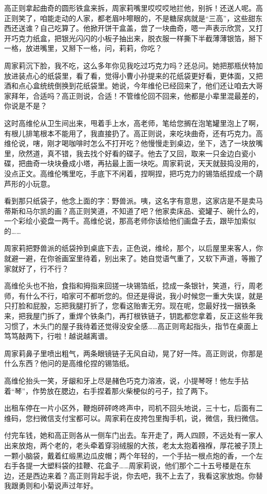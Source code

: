 \documentclass[lang=cn,newtx,12pt,scheme=chinese]{elegantbook}
\begin{document}
高正则拿起曲奇的圆形铁盒来拆，周家莉嘴里哎哎哎地拦他，别拆！还送人呢。高正则笑了，咱能走动的人家，都老眉咔嚓眼的，不是糖尿病就是“三高”，这些甜东西还送谁？自己吃算了。他掀开饼干盒盖，尝了一块曲奇，嗯一声表示欣赏，又打开巧克力纸盒，把银光闪闪的小板子抽出来，脱衣服一样撕下半截薄薄银箔，掰下一格，放进嘴里，又掰下一格，问，莉莉，你吃？

周家莉沉下脸，我不吃，这么多年你见我吃过巧克力吗？还总问。她把那瓶伏特加放进装点心的纸袋里，看了看，觉得小曹小孙提来的花纸袋更好看，更体面，又把酒和点心盒统统倒换到花纸袋里。她说，今年维伦已经回来了，他们还让咱去大哥家拜年，合适吗？高正则说，合适！不管维伦回不回来，他都是小辈里混最差的，你说是不是？

这时高维伦从卫生间出来，甩着手上水，高老师，笔给您搁在泡笔罐里泡上了啊，有根儿排笔根本不能用了，我直接扔了。高正则说，来吃块曲奇，还有巧克力。高维伦说，嗐，刚才喝咖啡时怎么不打开吃？他慢慢走到桌边，坐下，选了一块放嘴里，欣然道，真不错，我去找个好看的碟子。他去了又回，取来一只金边白瓷小碟，把曲奇一块块叠成小塔，再拈最上面一块吃。周家莉说，天天就鼓捣没用的，没点正文。高维伦嘴里吃，手底下不闲着，捏啊捏，把巧克力的锡箔纸捏成一个葫芦形的小玩意。

看到那只纸袋子，他念上面的字：野兽派。咦，这名字有意思，这家店是不是卖马蒂斯和马尔凯的画？高正则笑道，不知道了吧？他家卖床品、瓷罐子、碗什么的，一个彩绘小瓷盘一两千。高维伦说，那高老师你该给他们画盘子去，跟毕加索似的……

周家莉把野兽派的纸袋拎到桌底下去，正色说，维纶，那个，以后屋里来客人，你就避一避，在你爸画室里待着，别出来了。她自觉语气重了，又软下声道，等搬了家就好了，行不行？

高维伦头也不抬，食指和拇指来回搓一块锡箔纸，捻成一条银针，笑道，行，周老师，有什么不行，咱家可不都听您的。但还是得说，我小时候您一重大失误，就是只打脸和屁股，忘把我腿打折了，您看这贻害无穷。现在呢，您最好找一捆铁条来，把我屋门拆了，重焊个铁条门，再打根铁链子，钥匙都您拿着，反正这些年我习惯了，木头门的屋子我待着还觉得没安全感……高正则弯起指头，指节在桌面上笃笃敲两下，行啦！越说越离谱。

周家莉鼻子里喷出粗气，两条眼镜链子无风自动，晃了好一阵。高正则说，你那是什么东西？他问的是高维伦捏的锡箔纸。

高维伦抬头一笑，牙龈和牙上尽是赭色巧克力溶液，说，小提琴呀！他左手拈着“琴”，作势放在腮边，右手捏着那火柴梗似的弓子，拉了两下。

出租车停在一片小区外，鞭炮砰砰咚咚声中，司机不回头地说，三十七，后面有二维码，您扫微信支付宝都可以。周家莉在皮挎包里掏手机，说，微信，我扫微信。

付完车钱，她和高正则各从一侧车门出去。车开走了，两人四顾，不远处有一家人出来放炮，两个老的，老头牵着穿羽绒服的大孩，老太太抱着襁褓，厚花被子顶上一颗小脑袋，戴着红缎黑边瓜皮帽；两个年轻的，一个手拈一根点炮的香，一个左右手各提一大塑料袋的挂鞭、花盒子……周家莉说，他们那个二十五号楼是在东边，还是西边来着？高正则背起手说，你去吧，我不上去了，我看这家放炮。你替我跟勇则和小菊说声过年好。
\end{document}
